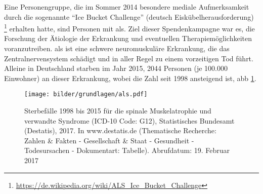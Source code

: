 
Eine Personengruppe, die im Sommer 2014 besondere mediale Aufmerksamkeit durch die sogenannte \enquote{Ice Bucket Challenge} (deutsch Eiskübelherausforderung) \footnote{\url{https://de.wikipedia.org/wiki/ALS_Ice_Bucket_Challenge}} erhalten hatte, sind Personen mit \acf{als}. Ziel dieser Spendenkampagne war es, die Forschung \bzgl der Ätiologie der Erkrankung und eventuellen Therapiemöglichkeiten voranzutreiben. \acs{als} ist eine schwere neuromuskuläre Erkrankung, die das Zentralnervensystem schädigt und in aller Regel zu einem vorzeitigen Tod führt. Alleine in Deutschland starben im Jahr 2015, 2044 Personen (je 100.000 Einwohner) an dieser Erkrankung, wobei die Zahl seit 1998 ansteigend ist, \vgl \acl{abb} \ref{fig:stat}.

\begin{figure}[ht]
   \begin{minipage}[t]{\linewidth} 
      \centering 
      \texttt{[image: bilder/grundlagen/als.pdf]}
   \end{minipage}%
   \caption{Sterbefälle 1998 bis 2015 für die spinale Muskelatrophie und verwandte Syndrome (ICD-10 Code: G12), Statistisches Bundesamt (Destatis), 2017. In www.destatis.de (Thematische Recherche: Zahlen \& Fakten - Gesellschaft \& Staat - Gesundheit - Todesursachen - Dokumentart: Tabelle). Abrufdatum: 19. Februar 2017 \protect\footnotemark }\label{fig:stat} 
\end{figure} 

